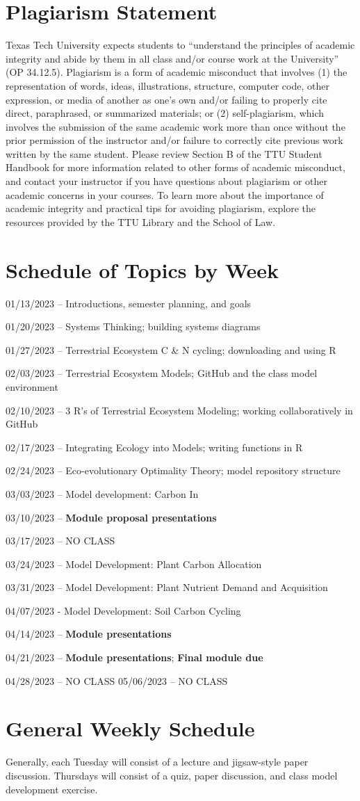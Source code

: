 \documentclass[12pt, notitlepage]{article}   	%
\begin{document}
{\section{Plagiarism Statement}
Texas Tech University expects students to “understand the principles of academic integrity 
and abide by them in all class and/or course work at the University” (OP 34.12.5). 
Plagiarism is a form of academic misconduct that involves (1) the representation of words, 
ideas, illustrations, structure, computer code, other expression, or media of another as 
one's own and/or failing to properly cite direct, paraphrased, or summarized materials; 
or (2) self-plagiarism, which involves the submission of the same academic work more than 
once without the prior permission of the instructor and/or failure to correctly cite 
previous work written by the same student. Please review Section B of the TTU 
Student Handbook for more information related to other forms of academic misconduct, 
and contact your instructor if you have questions about plagiarism or other 
academic concerns in your courses. To learn more about the importance of 
academic integrity and practical tips for avoiding plagiarism, explore the 
resources provided by the TTU Library and the School of Law.

\newpage

\section*{Schedule of Topics by Week}
01/13/2023 – Introductions, semester planning, and goals \par
01/20/2023 – Systems Thinking; building systems diagrams \par
01/27/2023 – Terrestrial Ecosystem C & N cycling; downloading and using R \par
02/03/2023 – Terrestrial Ecosystem Models; GitHub and the class model environment \par
02/10/2023 – 3 R's of Terrestrial Ecosystem Modeling; working collaboratively in GitHub \par
02/17/2023 – Integrating Ecology into Models; writing functions in R \par
02/24/2023 – Eco-evolutionary Optimality Theory; model repository structure \par
03/03/2023 – Model development: Carbon In \par
03/10/2023 – \textbf{Module proposal presentations} \par
03/17/2023 – NO CLASS \par
03/24/2023 – Model Development: Plant Carbon Allocation \par
03/31/2023 – Model Development: Plant Nutrient Demand and Acquisition \par
04/07/2023 - Model Development: Soil Carbon Cycling \par
04/14/2023 – \textbf{Module presentations} \par
04/21/2023 – \textbf{Module presentations}; \textbf{Final module due} \par
04/28/2023 – NO CLASS
05/06/2023 – NO CLASS

\section*{General Weekly Schedule}
Generally, each Tuesday will consist of a lecture and jigsaw-style paper discussion. Thursdays
will consist of a quiz, paper discussion, and class model development exercise.

} %
\end{document}
